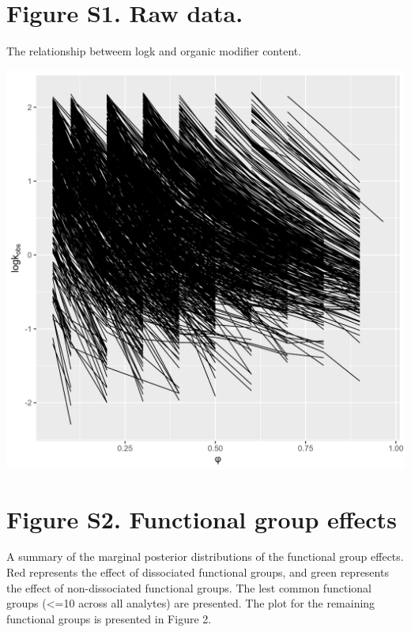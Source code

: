 \documentclass[
]{article}
\begin{document}
\newpage{}

\hypertarget{figure-s1.-raw-data.}{%
\section{Figure S1. Raw data.}\label{figure-s1.-raw-data.}}

The relationship betweem logk and organic modifier content.

\includegraphics{../deliv/figures/manuscript/supplement/raw-data.png}

\newpage{}

\hypertarget{figure-s2.-functional-group-effects}{%
\section{Figure S2. Functional group
effects}\label{figure-s2.-functional-group-effects}}

A summary of the marginal posterior distributions of the functional
group effects. Red represents the effect of dissociated functional
groups, and green represents the effect of non-dissociated functional
groups. The lest common functional groups (\textless=10 across all
analytes) are presented. The plot for the remaining functional groups is
presented in Figure 2.
\end{document}
